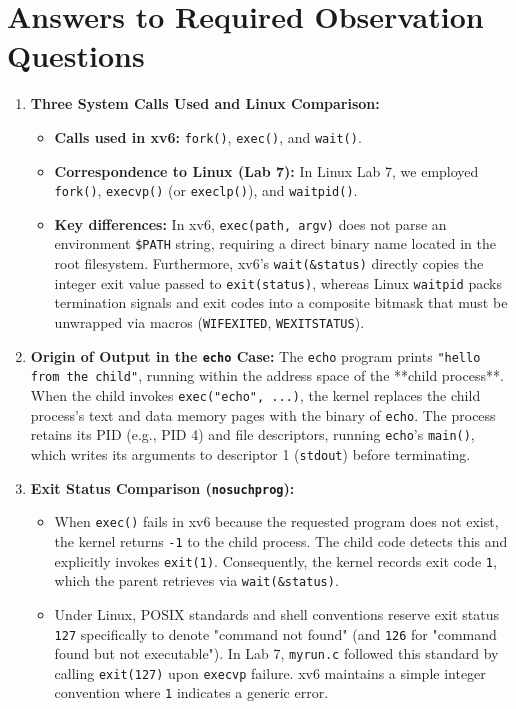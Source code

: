 \documentclass[12pt,a4paper]{report}
\numberwithin{equation}{chapter}
\numberwithin{figure}{chapter}
\numberwithin{table}{chapter}
\begin{document}
\section{Answers to Required Observation Questions}
\begin{enumerate}
    \item \textbf{Three System Calls Used and Linux Comparison:}
    \begin{itemize}
        \item \textbf{Calls used in xv6:} \texttt{fork()}, \texttt{exec()}, and \texttt{wait()}.
        \item \textbf{Correspondence to Linux (Lab 7):} In Linux Lab 7, we employed \texttt{fork()}, \texttt{execvp()} (or \texttt{execlp()}), and \texttt{waitpid()}.
        \item \textbf{Key differences:} In xv6, \texttt{exec(path, argv)} does not parse an environment \texttt{\$PATH} string, requiring a direct binary name located in the root filesystem. Furthermore, xv6's \texttt{wait(\&status)} directly copies the integer exit value passed to \texttt{exit(status)}, whereas Linux \texttt{waitpid} packs termination signals and exit codes into a composite bitmask that must be unwrapped via macros (\texttt{WIFEXITED}, \texttt{WEXITSTATUS}).
    \end{itemize}

    \item \textbf{Origin of Output in the \texttt{echo} Case:}
    The \texttt{echo} program prints \texttt{"hello from the child"}, running within the address space of the **child process**. When the child invokes \texttt{exec("echo", ...)}, the kernel replaces the child process's text and data memory pages with the binary of \texttt{echo}. The process retains its PID (e.g., PID 4) and file descriptors, running \texttt{echo}'s \texttt{main()}, which writes its arguments to descriptor 1 (\texttt{stdout}) before terminating.

    \item \textbf{Exit Status Comparison (\texttt{nosuchprog}):}
    \begin{itemize}
        \item When \texttt{exec()} fails in xv6 because the requested program does not exist, the kernel returns \texttt{-1} to the child process. The child code detects this and explicitly invokes \texttt{exit(1)}. Consequently, the kernel records exit code \texttt{1}, which the parent retrieves via \texttt{wait(\&status)}.
        \item Under Linux, POSIX standards and shell conventions reserve exit status \texttt{127} specifically to denote "command not found" (and \texttt{126} for "command found but not executable"). In Lab 7, \texttt{myrun.c} followed this standard by calling \texttt{exit(127)} upon \texttt{execvp} failure. xv6 maintains a simple integer convention where \texttt{1} indicates a generic error.
    \end{itemize}
\end{enumerate}
\end{document}
